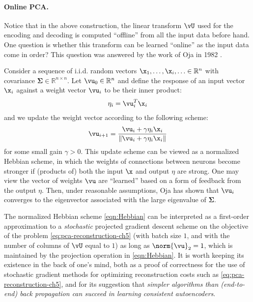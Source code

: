 \documentclass[../../book-main.tex]{subfiles}
\begin{document}
\paragraph{Online PCA.} Notice that in the above construction, the
linear transform $\vU$
used for the encoding and decoding is computed ``offline'' from all
the input data before hand. One question is whether this transform
can be learned ``online'' as the input data come in order? This
question was answered by the work of Oja in 1982 \cite{Oja1982SimplifiedNM}.
\begin{example} Consider a
  sequence of i.i.d. random vectors $\x_1, \ldots, \x_i, \ldots \in
  \mathbb{R}^n$ with covariance $\boldsymbol{\Sigma} \in
  \mathbb{R}^{n\times n}$. Let $\vu_0 \in \mathbb{R}^n$ and define
  the response of an input vector $\x_i$ against a weight vector
  $\vu_i$ to be their inner product:
  \begin{equation}
    \eta_i = \vu_i^T \x_i
  \end{equation}
  and we update the weight vector according to the following scheme:
  \begin{equation}
    \vu_{i+1} = \frac{\vu_i + \gamma \eta_i \x_i}{\|\vu_i + \gamma
    \eta_i \x_i\|}
    \label{eqn:Hebbian}
  \end{equation}
  for some small gain $\gamma >0$. This update scheme can be viewed
  as a normalized Hebbian scheme, in which the weights of connections
  between neurons become stronger if (products of) both the input
  $\x$ and output $\eta$ are strong. One may view the vector of
  weights $\vu$ are ``learned'' based on a form of feedback from the
  output $\eta$.
  Then, under reasonable assumptions, Oja \cite{Oja1982SimplifiedNM} has 
  shown that $\vu_i$ converges to the eigenvector associated with
  the large eigenvalue of $\boldsymbol{\Sigma}$.
\end{example}

The normalized Hebbian scheme \eqref{eqn:Hebbian} can be interpreted as
a first-order approximation to a \textit{stochastic} projected
gradient descent scheme on
the objective of the problem \eqref{eq:pca-reconstruction-ch5} (with batch size
$1$, and with the number of columns of $\vU$ equal to $1$) as long as
$\norm{\vu}_2 = 1$, which is maintained by the projection operation in
\eqref{eqn:Hebbian}.
It is worth keeping its existence in the back of one's mind, both as
a proof of correctness for the use of stochastic gradient methods for
optimizing reconstruction costs such as
\eqref{eq:pca-reconstruction-ch5}, and for its
suggestion that \textit{simpler algorithms than (end-to-end) back
  propagation can
succeed in learning consistent autoencoders}.
\end{document}

